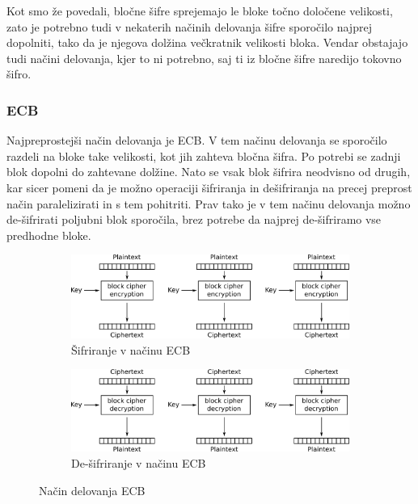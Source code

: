 \documentclass[12pt,a4paper,openany]{book}
\begin{document}
Kot smo že povedali, bločne šifre sprejemajo le bloke točno določene velikosti, zato je potrebno tudi v nekaterih načinih delovanja šifre sporočilo najprej dopolniti, tako da je njegova dolžina večkratnik velikosti bloka. Vendar obstajajo tudi načini delovanja, kjer to ni potrebno, saj ti iz bločne šifre naredijo tokovno šifro.


\subsubsection{ECB}
\label{subs:ECB}

Najpreprostejši način delovanja je \gls{ECB}. V tem načinu delovanja se sporočilo razdeli na bloke take velikosti, kot jih zahteva bločna šifra. Po potrebi se zadnji blok dopolni do zahtevane dolžine. Nato se vsak blok šifrira neodvisno od drugih, kar sicer pomeni da je možno operaciji šifriranja in dešifriranja na precej preprost način paralelizirati in s tem pohitriti. Prav tako je v tem načinu delovanja možno de-šifrirati poljubni blok sporočila, brez potrebe da najprej de-šifriramo vse predhodne bloke.

\begin{figure}[ht!]
  \centering
  \begin{subfigure}[b]{\textwidth}
    \includegraphics[width=\textwidth]{images/ECB_encryption}
    \caption{Šifriranje v načinu \gls{ECB}}
\label{fig:ecbenc}
  \end{subfigure}
  \begin{subfigure}[b]{\textwidth}
    \includegraphics[width=\textwidth]{images/ECB_decryption}
    \caption{De-šifriranje v načinu \gls{ECB}}
\label{fig:ecbdec}
  \end{subfigure}
  \caption{Način delovanja \gls{ECB}}
\label{fig:ecbmode}

\end{figure}
\end{document}
